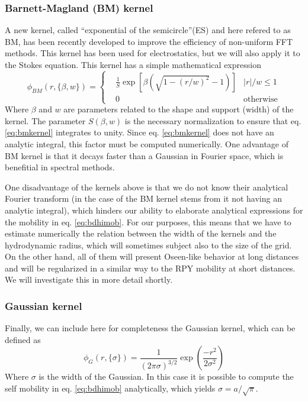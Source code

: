 \documentclass[ twoside,openright,titlepage,numbers=noenddot,%
headinclude,footinclude,cleardoublepage=empty,abstract=on,
BCOR=5mm,paper=a4,fontsize=11pt, dvipsnames
]{scrreprt}
\begin{document}
\subsubsection*{Barnett-Magland (BM) kernel}
A new kernel, called ``exponential of the semicircle''(ES) and here refered to as BM, has been recently developed to improve the efficiency of non-uniform \gls{FFT} methods\cite{Barnett2019}. This kernel has been used for electrostatics\cite{Shamshirgar2021}, but we will also apply it to the Stokes equation. This kernel has a simple mathematical expression
\begin{equation}
  \label{eq:bmkernel}
  \phi_{BM}(r,\{\beta, w\}) = \left\{
  \begin{aligned}
    &\frac{1}{S}\exp\left[\beta(\sqrt{1-(r/w)^2}-1)\right] & |r|/w\le 1\\
    & 0 & \textrm{otherwise}
  \end{aligned}\right.
\end{equation}
Where $\beta$ and $w$ are parameters related to the shape and support (width) of the kernel. The parameter $S(\beta, w)$ is the necessary normalization to ensure that eq. \eqref{eq:bmkernel} integrates to unity. Since eq. \eqref{eq:bmkernel} does not have an analytic integral, this factor must be computed numerically. One advantage of BM kernel is that it decays faster than a Gaussian in Fourier space, which is benefitial in spectral methods\cite{Barnett2019}.

One disadvantage of the kernels above is that we do not know their analytical Fourier transform (in the case of the BM kernel stems from it not having an analytic integral), which hinders our ability to elaborate analytical expressions for the mobility in eq. \eqref{eq:bdhimob}.
For our purposes, this means that we have to estimate numerically the relation between the width of the kernels and the hydrodynamic radius, which will sometimes subject also to the size of the grid.
On the other hand, all of them will present Oseen-like behavior at long distances and will be regularized in a similar way to the \gls{RPY} mobility at short distances.
We will investigate this in more detail shortly.
\subsubsection*{Gaussian kernel}
Finally, we can include here for completeness the Gaussian kernel, which can be defined as
\begin{equation}
  \label{eq:gaussiankernel}
  \phi_G(r,\{\sigma\}) = \frac{1}{(2\pi\sigma)^{3/2}}\exp\left(\frac{-r^2}{2\sigma^2}\right)
\end{equation}
Where $\sigma$ is the width of the Gaussian.
In this case it is possible to compute the self mobility in eq. \eqref{eq:bdhimob} analytically, which yields $\sigma = a/\sqrt{\pi}$.
\end{document}
